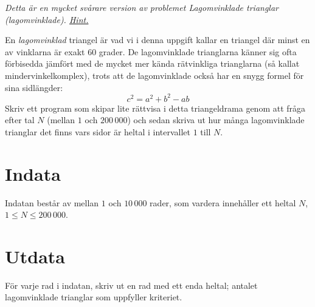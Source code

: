 \emph{Detta är en mycket svårare version av problemet Lagomvinklade trianglar (lagomvinklade). \href{https://en.wikipedia.org/wiki/Eisenstein_integer}{Hint.}}

En \emph{lagomvinklad} triangel är vad vi i denna uppgift kallar en triangel där minst en av vinklarna är exakt 60 grader. De lagomvinklade trianglarna känner sig ofta förbisedda jämfört med de mycket mer kända rätvinkliga trianglarna (så kallat mindervinkelkomplex), trots att de lagomvinklade också har en snygg formel för sina sidlängder:
\begin{equation*}
	c^2 = a^2 + b^2 - ab
\end{equation*}
Skriv ett program som skipar lite rättvisa i detta triangeldrama genom att fråga efter tal $N$ (mellan $1$ och $200\,000$) och sedan skriva ut hur många lagomvinklade trianglar det finns vars sidor är heltal i intervallet $1$ till $N$.

\section*{Indata}
Indatan består av mellan $1$ och $10\,000$ rader, som vardera innehåller ett heltal $N$, $1 \leq N \leq 200\,000$.

\section*{Utdata}
För varje rad i indatan, skriv ut en rad med ett enda heltal; antalet lagomvinklade trianglar som uppfyller kriteriet.

